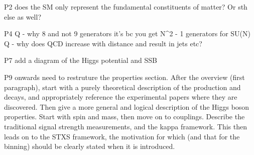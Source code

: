 P2
does the SM only represent the fundamental constituents of matter? Or sth else as well?

P4
Q - why 8 and not 9 generators it's bc you get N^2 - 1 generators for SU(N)
Q - why does QCD increase with distance and result in jets etc?

P7
add a diagram of the Higgs potential and SSB

P9 onwards
need to restruture the properties section. 
After the overview (first paragraph), 
start with a purely theoretical description of the production and decays, 
and appropriately reference the experimental papers where they are discovered.
Then give a more general and logical description of the Higgs boson properties. 
Start with spin and mass, then move on to couplings. 
Describe the traditional signal strength measurements, and the kappa framework. 
This then leads on to the STXS framework, 
the motivation for which (and that for the binning) should be clearly stated when it is introduced. 
